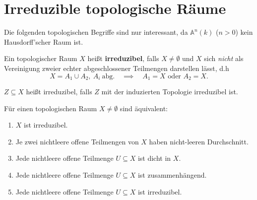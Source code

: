 
\section{Irreduzible topologische Räume}
\label{sec:irreduzibilitaet-top}

Die folgenden topologischen Begriffe sind nur interessant, da $\mathbb{A}^{n}(k)$
($n>0$) kein Hausdorff'scher Raum ist.
\begin{defn}
  \label{def:irreduzibel}
  Ein topologischer Raum $X$ heißt \textbf{irreduzibel},
  falls $X\neq\emptyset$ und $X$ sich \emph{nicht} als Vereinigung
  zweier echter abgeschlossener Teilmengen darstellen lässt, d.h
  \[
    X=A_{1}\cup A_{2},\ A_{i}\ \text{abg.}\quad\implies\quad A_{1}=X\text{ oder }A_{2}=X.
  \]

  $Z\subseteq X$ heißt irreduzibel, falls $Z$ mit der induzierten Topologie
  irreduzibel ist.
\end{defn}
\begin{prop}
  \label{prop:charakterisierung-irreduzibel}
  Für einen topologischen Raum $X \neq \emptyset$ sind äquivalent:
  \begin{enumerate}
  \item $X$ ist irreduzibel.
  \item Je zwei nichtleere offene Teilmengen von $X$ haben nicht-leeren
    Durchschnitt.
  \item Jede nichtleere offene Teilmenge $U\subseteq X$ ist dicht in $X$.
  \item Jede nichtleere offene Teilmenge $U\subseteq X$ ist zusammenhängend.
  \item Jede nichtleere offene Teilmenge $U\subseteq X$ ist irreduzibel.
  \end{enumerate}
\end{prop}
